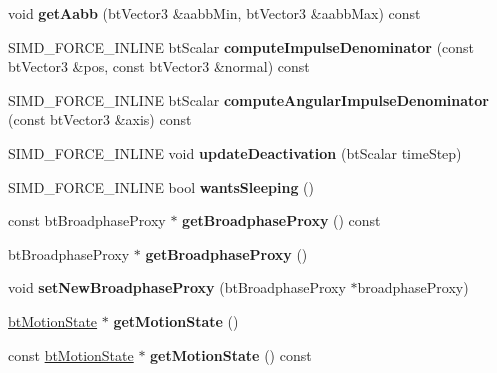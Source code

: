 \begin{DoxyCompactItemize}
void {\bfseries get\+Aabb} (bt\+Vector3 \&aabb\+Min, bt\+Vector3 \&aabb\+Max) const
\item 
\mbox{\label{classbtRigidBody_a8637d220d3002af281bdb81d5bedc1ba}} 
S\+I\+M\+D\+\_\+\+F\+O\+R\+C\+E\+\_\+\+I\+N\+L\+I\+NE bt\+Scalar {\bfseries compute\+Impulse\+Denominator} (const bt\+Vector3 \&pos, const bt\+Vector3 \&normal) const
\item 
\mbox{\label{classbtRigidBody_a18731fc59583c19e42b63a4e5d150d7c}} 
S\+I\+M\+D\+\_\+\+F\+O\+R\+C\+E\+\_\+\+I\+N\+L\+I\+NE bt\+Scalar {\bfseries compute\+Angular\+Impulse\+Denominator} (const bt\+Vector3 \&axis) const
\item 
\mbox{\label{classbtRigidBody_aa48bf2e5bf090c613ad8e9aa605bc7df}} 
S\+I\+M\+D\+\_\+\+F\+O\+R\+C\+E\+\_\+\+I\+N\+L\+I\+NE void {\bfseries update\+Deactivation} (bt\+Scalar time\+Step)
\item 
\mbox{\label{classbtRigidBody_aa2ccbd4474fe0edef483533943b5d666}} 
S\+I\+M\+D\+\_\+\+F\+O\+R\+C\+E\+\_\+\+I\+N\+L\+I\+NE bool {\bfseries wants\+Sleeping} ()
\item 
\mbox{\label{classbtRigidBody_a7c6bbab3d998bb33d74272cca8c46375}} 
const bt\+Broadphase\+Proxy $\ast$ {\bfseries get\+Broadphase\+Proxy} () const
\item 
\mbox{\label{classbtRigidBody_a505e4a8179302137cb72f47595404e89}} 
bt\+Broadphase\+Proxy $\ast$ {\bfseries get\+Broadphase\+Proxy} ()
\item 
\mbox{\label{classbtRigidBody_a254399995032d1120492e419f588b28c}} 
void {\bfseries set\+New\+Broadphase\+Proxy} (bt\+Broadphase\+Proxy $\ast$broadphase\+Proxy)
\item 
\mbox{\label{classbtRigidBody_a2bbea712d9095f05ff3b031bbe4e6521}} 
\hyperlink{classbtMotionState}{bt\+Motion\+State} $\ast$ {\bfseries get\+Motion\+State} ()
\item 
\mbox{\label{classbtRigidBody_a5c1b92e131b5648386a7e399f2936df3}} 
const \hyperlink{classbtMotionState}{bt\+Motion\+State} $\ast$ {\bfseries get\+Motion\+State} () const

\end{DoxyCompactItemize}
